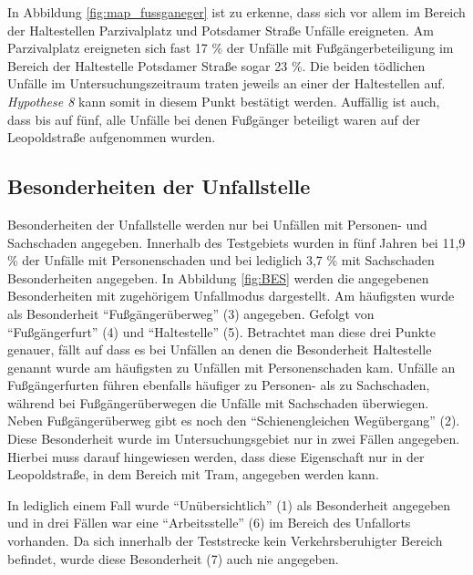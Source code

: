 In Abbildung \ref{fig:map_fussganeger} ist zu erkenne, dass sich vor allem im Bereich der Haltestellen Parzivalplatz und Potsdamer Straße Unfälle ereigneten. Am Parzivalplatz ereigneten sich fast 17 \% der Unfälle mit Fußgängerbeteiligung im Bereich der Haltestelle Potsdamer Straße sogar 23 \%. Die beiden tödlichen Unfälle im Untersuchungszeitraum traten jeweils an einer der Haltestellen auf. \textit{Hypothese 8} kann somit in diesem Punkt bestätigt werden. Auffällig ist auch, dass bis auf fünf, alle Unfälle bei denen Fußgänger beteiligt waren auf der Leopoldstraße aufgenommen wurden.

\subsection{Besonderheiten der Unfallstelle}
Besonderheiten der Unfallstelle werden nur bei Unfällen mit Personen- und Sachschaden angegeben. Innerhalb des Testgebiets wurden in fünf Jahren bei 11,9 \% der Unfälle mit Personenschaden und bei lediglich 3,7 \% mit Sachschaden Besonderheiten angegeben. In Abbildung \ref{fig:BES} werden die angegebenen Besonderheiten mit zugehörigem Unfallmodus dargestellt. Am häufigsten wurde als Besonderheit \enquote{Fußgängerüberweg} (3) angegeben. Gefolgt von \enquote{Fußgängerfurt} (4) und \enquote{Haltestelle} (5). Betrachtet man diese drei Punkte genauer, fällt auf dass es bei Unfällen an denen die Besonderheit Haltestelle genannt wurde am häufigsten zu Unfällen mit Personenschaden kam. Unfälle an Fußgängerfurten führen ebenfalls häufiger zu Personen- als zu Sachschaden, während bei Fußgängerüberwegen die Unfälle mit Sachschaden überwiegen. Neben Fußgängerüberweg gibt es noch den \enquote{Schienengleichen Wegübergang} (2). Diese Besonderheit wurde im Untersuchungsgebiet nur in zwei Fällen angegeben. Hierbei muss darauf hingewiesen werden, dass diese Eigenschaft nur in der Leopoldstraße, in dem Bereich mit Tram, angegeben werden kann.

In lediglich einem Fall wurde \enquote{Unübersichtlich} (1) als Besonderheit angegeben und in drei Fällen war eine \enquote{Arbeitsstelle} (6) im Bereich des Unfallorts vorhanden. Da sich innerhalb der Teststrecke kein Verkehrsberuhigter Bereich befindet, wurde diese Besonderheit (7) auch nie angegeben. 

